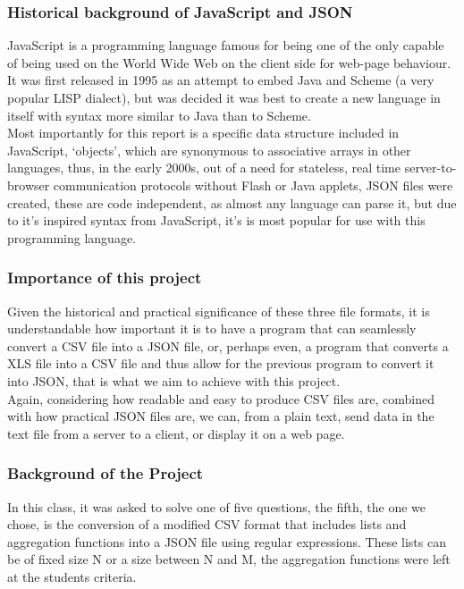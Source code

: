 \documentclass[11pt,a4paper,times]{report}
\begin{document}
\subsubsection{Historical background of JavaScript and JSON}JavaScript
is a programming language famous for being one of the only capable of
being used on the World Wide Web on the client side for web-page behaviour.
It was first released in 1995 as an attempt to embed Java and Scheme
(a very popular LISP dialect), but was decided it was best to create
a new language in itself with syntax more similar to Java than to Scheme.
\\
Most importantly for this report is a specific data structure included in 
JavaScript, `objects', which are synonymous to associative arrays
in other languages, thus, in the early 2000s, out of a need for stateless,
real time server-to-browser communication protocols without Flash or
Java applets, JSON files were created, these are code independent,
as almost any language can parse it, but due to it's inspired syntax from
JavaScript, it's is most popular for use with this programming language.

\subsubsection{Importance of this project}Given the historical and
practical significance of these three file formats, it is understandable
how important it is to have a program that can seamlessly convert a CSV
file into a JSON file, or, perhaps even, a program that converts a XLS 
file into a CSV file and thus allow for the previous program to convert 
it into JSON, that is what we aim to achieve with this project.
\\
Again, considering how readable and easy to produce CSV files are,
combined with how practical JSON files are, we can, from a plain text,
send data in the text file from a server to a client, or display it on a 
web page.


\subsubsection{Background of the Project}In this class, it was asked to
solve one of five questions, the fifth, the one we chose, is the 
conversion of a modified CSV format that includes lists and aggregation 
functions into a JSON file using regular expressions. These lists can be
of fixed size N or a size between N and M, the aggregation functions were
left at the students criteria.
\end{document}
